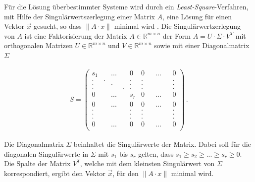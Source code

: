 Für die Lösung überbestimmter Systeme wird durch ein \textit{Least-Square}-Verfahren, mit Hilfe der Singulärwertszerlegung einer Matrix $A$, eine Lösung für einen Vektor $\vec{x}$ gesucht, so dass $\parallel A \cdot x \parallel$ minimal wird \cite{HZ,Scholz,Schwarz}. Die Singulärwertzerlegung von $A$ ist eine Faktorisierung der Matrix \ensuremath{A \in \mathbb{R}^{m \times n}} der Form \ensuremath{A = U \cdot \Sigma \cdot V^T} mit orthogonalen Matrizen \ensuremath{U \in \mathbb{R}^{m \times n}} und \ensuremath{V \in \mathbb{R}^{m \times n}} sowie mit einer Diagonalmatrix $\Sigma$ 


\begin{gather}
	S = \begin{pmatrix}
		s_1&&...&&0&0&&...&&0\\
		.&.&&&.&.&&&&.\\
		.&&.&&.&.&&&&.\\
		.&&&.&.&.&&&&.\\
		0&&...&&s_r&0&&...&&0\\	
		0&&...&&0&0&&...&&0\\
		.&&&&.&.&&&&.\\
		.&&&&.&.&&&&.\\	
		.&&&&.&.&&&&.\\	
		0&&...&&0&0&&...&&0\\	
	\end{pmatrix} \, .
\end{gather}

Die  Diagonalmatrix $\Sigma$ beinhaltet die Singulärwerte der Matrix. Dabei soll für die diagonalen Singulärwerte in $\Sigma$ mit $s_1$ bis $s_r$ gelten, dass \ensuremath{s_1 \geq s_2 \geq ... \geq s_r \ge 0 }\cite{Scholz}. Die Spalte der Matrix $V^T$, welche mit dem kleinsten Singulärwert von $\Sigma$ korrespondiert, ergibt den Vektor $\vec{x}$, für den \ensuremath{\parallel A \cdot x\parallel} minimal wird. \\





